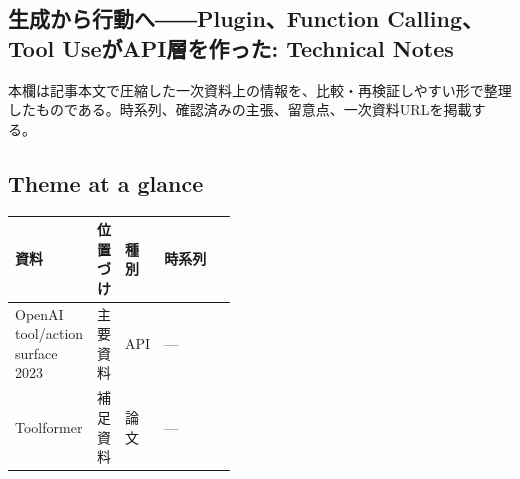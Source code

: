 \subsection*{生成から行動へ――Plugin、Function Calling、Tool UseがAPI層を作った: Technical Notes}
本欄は記事本文で圧縮した一次資料上の情報を、比較・再検証しやすい形で整理したものである。時系列、確認済みの主張、留意点、一次資料URLを掲載する。
\medskip
\subsection*{Theme at a glance}
\begin{center}
\footnotesize
\begin{tabularx}{\linewidth}{@{}p{0.20\linewidth}p{0.10\linewidth}p{0.14\linewidth}X@{}}
\toprule
資料 & 位置づけ & 種別 & 時系列 \\
\midrule
OpenAI tool/action surface 2023 & 主要資料 & API & — \\
Toolformer & 補足資料 & 論文 & — \\
\bottomrule
\end{tabularx}
\end{center}
\normalsize

